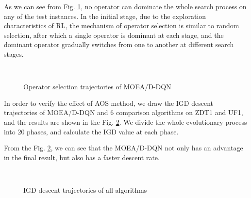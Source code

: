 \documentclass[journal]{IEEEtran}
\begin{document}
As we can see from Fig. \ref{fig:ops_tra}, no operator can dominate the whole search process on any of the test instances. In the initial stage, due to the exploration characteristics of RL, the mechanism of operator selection is similar to random selection, after which a single operator is dominant at each stage, and the dominant operator gradually switches from one to another at different search stages.


\begin{figure}[]
    \centering
    \hfil
    \\
    \caption{Operator selection trajectories of MOEA/D-DQN}
    \label{fig:ops_tra}
\end{figure}

In order to verify the effect of AOS method, we draw the IGD descent trajectories of MOEA/D-DQN and 6 comparison algorithms on ZDT1 and UF1, and the results are shown in the Fig. \ref{fig:igd_tra}.
We divide the whole evolutionary process into 20 phases, and calculate the IGD value at each phase.

From the Fig. \ref{fig:igd_tra}, we can see that the MOEA/D-DQN not only has an advantage in the final result, but also has a faster descent rate.

\begin{figure}[]
    \centering
    \hfil
    \\
    \caption{IGD descent trajectories of all algorithms}
    \label{fig:igd_tra}
\end{figure}
\end{document}
